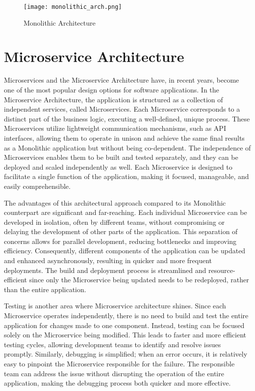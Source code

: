 \begin{figure}[!h]
    \graphicspath{ {./diagrams/} }
    \texttt{[image: monolithic\_arch.png]}
    \centering
    \caption{Monolithic Architecture}
    \label{fig:mono_arch}
\end{figure}

\section{Microservice Architecture}

Microservices and the Microservice Architecture have, in recent years, become one of the most popular design options for software applications. In the Microservice Architecture, the application is structured as a collection of independent services, called Microservices. Each Microservice corresponds to a distinct part of the business logic, executing a well-defined, unique process\cite{monovsmicro}\cite{microservicesdef}. These Microservices utilize lightweight communication mechanisms, such as API interfaces, allowing them to operate in unison and achieve the same final results as a Monolithic application but without being co-dependent. The independence of Microservices enables them to be built and tested separately, and they can be deployed and scaled independently as well. Each Microservice is designed to facilitate a single function of the application, making it focused, manageable, and easily comprehensible\cite{chandrinos_thesis}.

The advantages of this architectural approach compared to its Monolithic counterpart are significant and far-reaching. Each individual Microservice can be developed in isolation, often by different teams, without compromising or delaying the development of other parts of the application. This separation of concerns allows for parallel development, reducing bottlenecks and improving efficiency. Consequently, different components of the application can be updated and enhanced asynchronously, resulting in quicker and more frequent deployments. The build and deployment process is streamlined and resource-efficient since only the Microservice being updated needs to be redeployed, rather than the entire application.

Testing is another area where Microservice architecture shines. Since each Microservice operates independently, there is no need to build and test the entire application for changes made to one component. Instead, testing can be focused solely on the Microservice being modified. This leads to faster and more efficient testing cycles, allowing development teams to identify and resolve issues promptly. Similarly, debugging is simplified; when an error occurs, it is relatively easy to pinpoint the Microservice responsible for the failure. The responsible team can address the issue without disrupting the operation of the entire application, making the debugging process both quicker and more effective.

